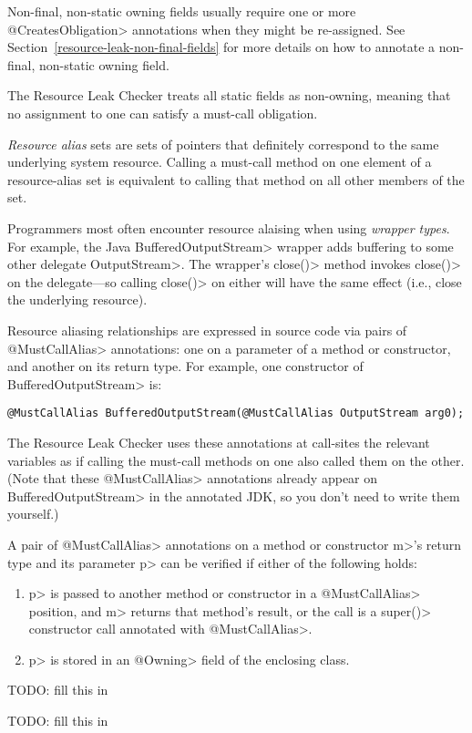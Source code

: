 Non-final, non-static owning fields usually require one or more \<@CreatesObligation> annotations
when they might be re-assigned. See Section~\ref{resource-leak-non-final-fields} for
more details on how to annotate a non-final, non-static owning field.

The Resource Leak Checker treats all static fields as non-owning, meaning that no assignment to one
can satisfy a must-call obligation.


\emph{Resource alias} sets are sets of pointers that
definitely correspond to the same underlying system resource.
Calling a must-call method on one element of a resource-alias set
is equivalent to calling that method on all other members of the set.

Programmers most often encounter resource alaising when using \emph{wrapper types}.
For example, the Java \<BufferedOutputStream> wrapper adds buffering to some other delegate \<OutputStream>.
The wrapper's \<close()> method invokes \<close()> on the delegate---so calling \<close()> on either
will have the same effect (i.e., close the underlying resource).

Resource aliasing relationships are expressed in source code via pairs of \<@MustCallAlias> annotations:
one on a parameter of a method or constructor, and another on its return type.
For example, one constructor of \<BufferedOutputStream> is:
\begin{verbatim}
@MustCallAlias BufferedOutputStream(@MustCallAlias OutputStream arg0);
\end{verbatim}
The Resource Leak Checker uses these annotations at call-sites the relevant variables as if
calling the must-call methods on one also called them on the other.
(Note that these \<@MustCallAlias> annotations already appear on
\<BufferedOutputStream> in the annotated JDK, so you don't need to write
them yourself.)

A pair of \<@MustCallAlias> annotations on a method or constructor \<m>'s return type
and its parameter \<p> can be verified if either of the following holds:
\begin{enumerate}
\item \<p> is passed to another method or constructor in a
  \<@MustCallAlias> position, and \<m> returns that method's result,
  or the call is a \<super()> constructor call annotated
  with \<@MustCallAlias>.
\item \<p> is stored in an \<@Owning> field of the enclosing class.
\end{enumerate}


TODO: fill this in


TODO: fill this in

